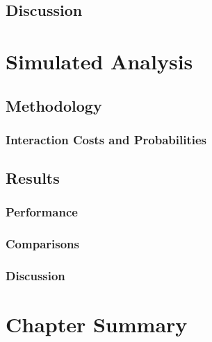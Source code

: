\subsection{Discussion}

\section{Simulated Analysis}\label{chap:snippets:simulations}

\subsection{Methodology}

\subsubsection{Interaction Costs and Probabilities}

\subsection{Results}

\subsubsection{Performance}

\subsubsection{Comparisons}

\subsubsection{Discussion}

\section{Chapter Summary}